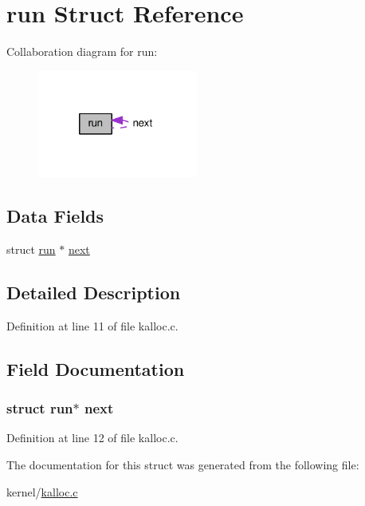 \hypertarget{structrun}{\section{run Struct Reference}
\label{structrun}
}


Collaboration diagram for run\-:
\nopagebreak
\begin{figure}[H]
\begin{center}
\leavevmode
\includegraphics[width=149pt]{structrun__coll__graph}
\end{center}
\end{figure}
\subsection*{Data Fields}
\begin{DoxyCompactItemize}
\item 
struct \hyperlink{structrun}{run} $\ast$ \hyperlink{structrun_afa37bad156291ffb38122b28ebd546ef}{next}
\end{DoxyCompactItemize}


\subsection{Detailed Description}


Definition at line 11 of file kalloc.\-c.



\subsection{Field Documentation}
\hypertarget{structrun_afa37bad156291ffb38122b28ebd546ef}{
\subsubsection[{next}]{\setlength{\rightskip}{0pt plus 5cm}struct {\bf run}$\ast$ next}}\label{structrun_afa37bad156291ffb38122b28ebd546ef}


Definition at line 12 of file kalloc.\-c.



The documentation for this struct was generated from the following file\-:\begin{DoxyCompactItemize}
\item 
kernel/\hyperlink{kalloc_8c}{kalloc.\-c}\end{DoxyCompactItemize}
